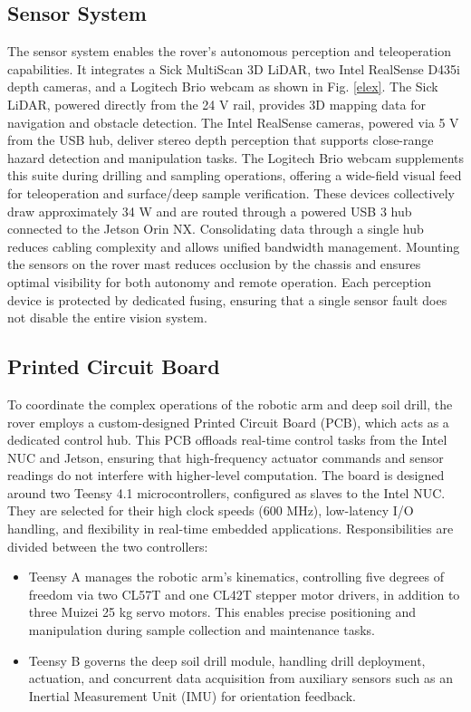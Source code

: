 \documentclass[letterpaper, 10 pt, conference]{ieeeconf}  %
\begin{document}
\subsection{Sensor System}
The sensor system enables the rover’s autonomous perception and teleoperation capabilities. It integrates a Sick MultiScan 3D LiDAR, two Intel RealSense D435i depth cameras, and a Logitech Brio webcam as shown in Fig. \ref{elex}. The Sick LiDAR, powered directly from the 24 V rail, provides 3D mapping data for navigation and obstacle detection. The Intel RealSense cameras, powered via 5 V from the USB hub, deliver stereo depth perception that supports close-range hazard detection and manipulation tasks. The Logitech Brio webcam supplements this suite during drilling and sampling operations, offering a wide-field visual feed for teleoperation and surface/deep sample verification. These devices collectively draw approximately 34 W and are routed through a powered USB 3 hub connected to the Jetson Orin NX. Consolidating data through a single hub reduces cabling complexity and allows unified bandwidth management. Mounting the sensors on the rover mast reduces occlusion by the chassis and ensures optimal visibility for both autonomy and remote operation. Each perception device is protected by dedicated fusing, ensuring that a single sensor fault does not disable the entire vision system.

\subsection{Printed Circuit Board}
To coordinate the complex operations of the robotic arm and deep soil drill, the rover employs a custom-designed Printed Circuit Board (PCB), which acts as a dedicated control hub. This PCB offloads real-time control tasks from the Intel NUC and Jetson, ensuring that high-frequency actuator commands and sensor readings do not interfere with higher-level computation.
The board is designed around two Teensy 4.1 microcontrollers, configured as slaves to the Intel NUC. They are selected for their high clock speeds (600 MHz), low-latency I/O handling, and flexibility in real-time embedded applications. Responsibilities are divided between the two controllers:
\begin{itemize}
    \item Teensy A manages the robotic arm’s kinematics, controlling five degrees of freedom via two CL57T and one CL42T stepper motor drivers, in addition to three Muizei 25 kg servo motors. This enables precise positioning and manipulation during sample collection and maintenance tasks.
    \item Teensy B governs the deep soil drill module, handling drill deployment, actuation, and concurrent data acquisition from auxiliary sensors such as an Inertial Measurement Unit (IMU) for orientation feedback.
\end{itemize}
\end{document}
